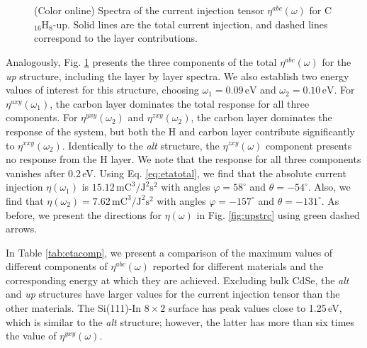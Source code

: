 \documentclass[pss]{wiley2sp} %
\begin{document}
\begin{figure}[b]
\centering
{}\\
\\
\caption{(Color online) Spectra of the current injection tensor
{$\eta^{abc}(\omega)$} for C$_{16}$H$_{8}$-up. Solid lines are the total
current injection, and dashed lines correspond to the layer
contributions.\label{fig:up-eta}}
\end{figure}


Analogously, Fig. \ref{fig:up-eta} presents the three components of the total
$\eta^{abc}(\omega)$ for the \emph{up} structure, including the layer by layer
spectra. We also establish two energy values of interest for this structure,
choosing $\omega_{1} = 0.09\,\mathrm{eV}$ and $\omega_{2} = 0.10\,\mathrm{eV}$. For
$\eta^{axy}(\omega_{1})$, the carbon layer dominates the total response for all three
components. For $\eta^{yxy}(\omega_{2})$ and $\eta^{zxy}(\omega_{2})$, the carbon layer
dominates the response of the system, but both the H and carbon layer contribute
significantly to $\eta^{xxy}(\omega_{2})$. Identically to the \emph{alt} structure,
the $\eta^{zxy}(\omega)$ component presents no response from the H layer.  We
note that the response for all three components vanishes after 0.2\,eV. Using
Eq. \eqref{eq:etatotal}, we find that the absolute current injection $\eta(\omega_{1})$
is $15.12\,\mathrm{mC}^{3}/\mathrm{J}^{2}\mathrm{s}^{2}$ with angles
$\varphi=58^{\circ}$ and $\theta=-54^{\circ}$. Also, we find that
$\eta(\omega_{2})=7.62\,\mathrm{mC}^{3}/\mathrm{J}^{2}\mathrm{s}^{2}$ with angles
$\varphi=-157^{\circ}$ and $\theta=-131^{\circ}$. As before, we present the
directions for $\eta(\omega)$ in Fig. \ref{fig:upstrc} using green dashed
arrows.

In Table \ref{tab:etacomp}, we present a comparison of the maximum values of
different components of $\eta^{abc}(\omega)$ reported for different materials
and the corresponding energy at which they are achieved. Excluding bulk CdSe,
the \emph{alt} and \emph{up} structures have larger values for the current
injection tensor than the other materials. The Si(111)-In $8\times 2$ surface
has peak values close to 1.25\,eV, which is similar to the \emph{alt} structure;
however, the latter has more than six times the value of $\eta^{yxy}(\omega)$.
\end{document}
